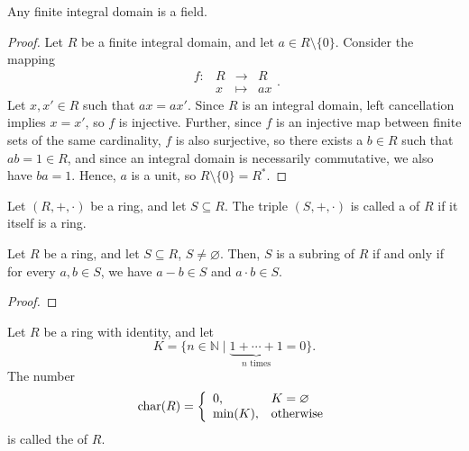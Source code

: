 \begin{thm}
Any finite integral domain is a field.
\end{thm}
\begin{proof}
Let $ R $ be a finite integral domain, and let $ a\in R\setminus\{0\} $. Consider the mapping
\begin{equation*}
    \begin{array}{rccc}
        f: & R & \to & R \\
        & x & \mapsto & ax
    \end{array}.
\end{equation*}
Let $ x,x'\in R $ such that $ ax=ax' $. Since $ R $ is an integral domain, left cancellation implies $ x=x' $, so $ f $ is injective. Further, since $ f $ is an injective map between finite sets of the same cardinality, $ f $ is also surjective, so there exists a $ b\in R $ such that $ ab=1\in R $, and since an integral domain is necessarily commutative, we also have $ ba=1 $. Hence, $ a $ is a unit, so $ R\setminus\{0\}=R^* $.
\end{proof}

\begin{defn}
Let $ (R,+,\cdot) $ be a ring, and let $ S\subseteq R $. The triple $ (S,+,\cdot) $ is called a  of $ R $ if it itself is a ring.
\end{defn}

\begin{thm}
Let $ R $ be a ring, and let $ S\subseteq R $, $ S\neq\varnothing $. Then, $ S $ is a subring of $ R $ if and only if for every $ a,b\in S $, we have $ a-b\in S $ and $ a\cdot b\in S $.
\end{thm}
\begin{proof}
\end{proof}

\begin{defn}
Let $ R $ be a ring with identity, and let
\begin{equation*}
    K=\{n\in\mathbb{N}\mid\underbrace{1+\cdots+1}_{n\text{ times}}=0\}.
\end{equation*}
The number
\begin{equation*}
    \operatorname{char}(R)=
    \left\{\begin{array}{ll}
        0, & K=\varnothing \\
        \min(K), & \text{otherwise}
    \end{array}\right.
\end{equation*}
is called the  of $ R $.
\end{defn}

